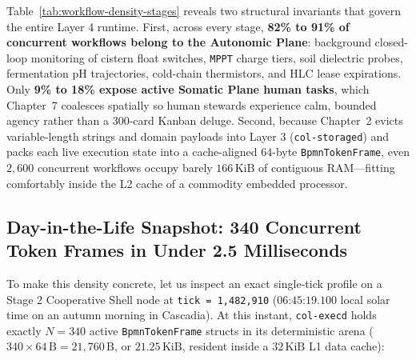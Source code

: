 Table~\ref{tab:workflow-density-stages} reveals two structural invariants that govern the entire Layer 4
runtime. First, across every stage, \textbf{82\% to 91\% of concurrent workflows belong to the Autonomic
Plane}: background closed-loop monitoring of cistern float switches, \texttt{MPPT} charge tiers, soil
dielectric probes, fermentation pH trajectories, cold-chain thermistors, and HLC lease expirations. Only
\textbf{9\% to 18\% expose active Somatic Plane human tasks}, which Chapter~7 coalesces spatially so human
stewards experience calm, bounded agency \parencite{weiser1996calm,little1961proof} rather than a 300-card
Kanban deluge. Second, because Chapter~2 evicts variable-length strings and domain payloads into Layer 3
(\texttt{col-storaged}) and packs each live execution state into a cache-aligned $64$-byte
\texttt{BpmnTokenFrame}, even $2{,}600$ concurrent workflows occupy barely $166\,\mathrm{KiB}$ of
contiguous RAM---fitting comfortably inside the L2 cache of a commodity embedded processor.

\subsection{Day-in-the-Life Snapshot: 340 Concurrent Token Frames in Under 2.5 Milliseconds}

To make this density concrete, let us inspect an exact single-tick profile on a Stage 2 Cooperative Shell
node at \texttt{tick = 1,482,910} ($06\text{:}45\text{:}19.100$ local solar time on an autumn morning in
Cascadia). At this instant, \texttt{col-execd} holds exactly $N = 340$ active \texttt{BpmnTokenFrame}
structs in its deterministic arena ($340 \times 64\,\mathrm{B} = 21{,}760\,\mathrm{B}$, or
$21.25\,\mathrm{KiB}$, resident inside a $32\,\mathrm{KiB}$ L1 data cache):


